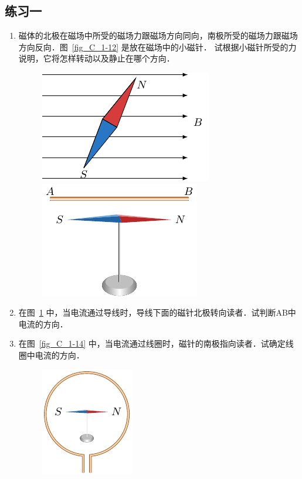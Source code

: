 \subsection*{练习一}
\begin{enumerate}
    \item 磁体的北极在磁场中所受的磁场力跟磁场方向同向，南极所受的磁场力跟磁场方向反向．图~\ref{fig_C_1-12} 是放在磁场中的小磁针．
    试根据小磁针所受的力说明，它将怎样转动以及静止在哪个方向．
\begin{figure}[htbp]
    \centering
    \begin{minipage}[t]{0.48\textwidth}
        \centering
        \includegraphics{fig/C/1-12.pdf}
        \caption{}\label{fig_C_1-12}
    \end{minipage}
    \begin{minipage}[t]{0.48\textwidth}
        \centering
        \includegraphics{fig/C/1-13.pdf}
        \caption{}\label{fig_C_1-13}
    \end{minipage}
\end{figure}
    \item 在图~\ref{fig_C_1-13} 中，当电流通过导线时，导线下面的磁针北极转向读者．试判断AB中电流的方向．
    \item 在图~\ref{fig_C_1-14} 中，当电流通过线圈时，磁针的南极指向读者．试确定线圈中电流的方向．
\begin{figure}[htbp]
    \centering
    \begin{minipage}[t]{0.48\textwidth}
        \centering
        \includegraphics{fig/C/1-14.pdf}

\end{minipage}
\end{figure}
\end{enumerate}
